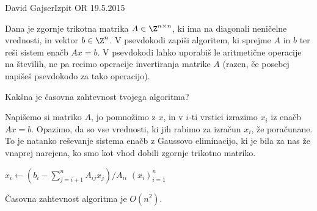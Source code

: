 \begin{naloga}{David Gajser}{Izpit OR 19.5.2015}
\begin{vprasanje}
Dana je zgornje trikotna matrika $A \in \Z^{n \times n}$,
ki ima na diagonali neničelne vred\-no\-sti,
in vektor $b \in \Z^n$.
V psevdokodi zapiši algoritem, ki sprejme $A$ in $b$
ter reši sistem enačb $Ax = b$.
V psevdokodi lahko uporabiš le aritmetične operacije na številih,
ne pa recimo operacije invertiranja matrike $A$
(razen, če posebej napišeš psevdokodo za tako operacijo).

Kakšna je časovna zahtevnost tvojega algoritma?
\end{vprasanje}

\begin{odgovor}
Napišemo si matriko $A$, jo pomnožimo z $x$,
in v $i$-ti vrstici izrazimo $x_i$ iz enačb $Ax = b$.
Opazimo, da so vse vrednosti, ki jih rabimo za izračun $x_i$, že poračunane.
To je natanko reševanje sistema enačb z Gaussovo eliminacijo,
ki je bila za nas že vnaprej narejena,
ko smo kot vhod dobili zgornje trikotno matriko.
\begin{small}
\begin{algorithmic}
    \State $x_i \gets (b_i - \sum_{j=i+1}^n A_{ij} x_j) / A_{ii}$
\EndFor
\State \Return $(x_i)_{i=1}^n$
\end{algorithmic}
\end{small}
Časovna zahtevnost algoritma je $O(n^2)$.
\end{odgovor}
\end{naloga}
